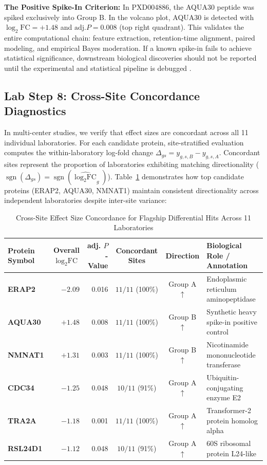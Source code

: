 \documentclass[11pt,twoside,openright]{book}
\begin{document}
\begin{biologicalinsight}
\textbf{The Positive Spike-In Criterion:} In PXD004886, the AQUA30 peptide was spiked exclusively into Group B. In the volcano plot, AQUA30 is detected with $\log_2\text{FC} = +1.48$ and $\text{adj.} P = 0.008$ (top right quadrant). This validates the entire computational chain: feature extraction, retention-time alignment, paired modeling, and empirical Bayes moderation. If a known spike-in fails to achieve statistical significance, downstream biological discoveries should not be reported until the experimental and statistical pipeline is debugged \cite{bruderer2017optimization}.
\end{biologicalinsight}

\subsection{Lab Step 8: Cross-Site Concordance Diagnostics}

In multi-center studies, we verify that effect sizes are concordant across all 11 individual laboratories. For each candidate protein, site-stratified evaluation computes the within-laboratory log-fold change $\Delta_{gs} = y_{g,s,B} - y_{g,s,A}$. Concordant sites represent the proportion of laboratories exhibiting matching directionality ($\operatorname{sgn}(\Delta_{gs}) = \operatorname{sgn}(\widehat{\log_2\text{FC}}_g)$). Table~\ref{tab:concordance} demonstrates how top candidate proteins (ERAP2, AQUA30, NMNAT1) maintain consistent directionality across independent laboratories despite inter-site variance:

\begin{table}[htbp]
\centering
\caption{Cross-Site Effect Size Concordance for Flagship Differential Hits Across 11 Laboratories}
\label{tab:concordance}
\small
\begin{tabularx}{\textwidth}{lrrccX}
\toprule
\textbf{Protein Symbol} & \textbf{Overall $\log_2\text{FC}$} & \textbf{adj. $P$-Value} & \textbf{Concordant Sites} & \textbf{Direction} & \textbf{Biological Role / Annotation} \\
\midrule
\textbf{ERAP2}   & $-2.09$ & 0.016 & $11 / 11$ (100\%) & Group A $\uparrow$ & Endoplasmic reticulum aminopeptidase \\
\textbf{AQUA30}  & $+1.48$ & 0.008 & $11 / 11$ (100\%) & Group B $\uparrow$ & Synthetic heavy spike-in positive control \\
\textbf{NMNAT1}  & $+1.31$ & 0.003 & $11 / 11$ (100\%) & Group B $\uparrow$ & Nicotinamide mononucleotide transferase \\
\textbf{CDC34}   & $-1.25$ & 0.048 & $10 / 11$ (91\%)  & Group A $\uparrow$ & Ubiquitin-conjugating enzyme E2 \cite{zhang2018dep} \\
\textbf{TRA2A}   & $-1.18$ & 0.001 & $11 / 11$ (100\%) & Group A $\uparrow$ & Transformer-2 protein homolog alpha \\
\textbf{RSL24D1} & $-1.12$ & 0.048 & $10 / 11$ (91\%)  & Group A $\uparrow$ & 60S ribosomal protein L24-like \\
\bottomrule
\end{tabularx}
\end{table}
\end{document}
